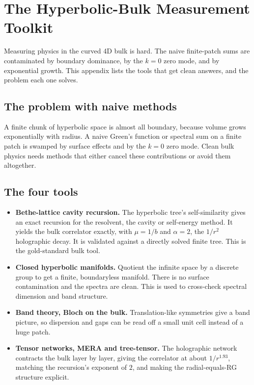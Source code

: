 \section{The Hyperbolic-Bulk Measurement Toolkit}

Measuring physics in the curved 4D bulk is hard. The naive finite-patch sums are contaminated by boundary
dominance, by the $k = 0$ zero mode, and by exponential growth. This appendix lists the tools that get clean
answers, and the problem each one solves.

\subsection{The problem with naive methods}

A finite chunk of hyperbolic space is almost all boundary, because volume grows exponentially with radius. A naive
Green's function or spectral sum on a finite patch is swamped by surface effects and by the $k = 0$ zero mode.
Clean bulk physics needs methods that either cancel these contributions or avoid them altogether.

\subsection{The four tools}

\begin{itemize}
  \item \textbf{Bethe-lattice cavity recursion.} The hyperbolic tree's self-similarity gives an exact recursion
  for the resolvent, the cavity or self-energy method. It yields the bulk correlator exactly, with $\mu = 1/b$ and
  $\alpha = 2$, the $1/r^2$ holographic decay. It is validated against a directly solved finite tree. This is the
  gold-standard bulk tool.
  \item \textbf{Closed hyperbolic manifolds.} Quotient the infinite space by a discrete group to get a finite,
  boundaryless manifold. There is no surface contamination and the spectra are clean. This is used to cross-check
  spectral dimension and band structure.
  \item \textbf{Band theory, Bloch on the bulk.} Translation-like symmetries give a band picture, so dispersion
  and gaps can be read off a small unit cell instead of a huge patch.
  \item \textbf{Tensor networks, MERA and tree-tensor.} The holographic network contracts the bulk layer by
  layer, giving the correlator at about $1/r^{1.93}$, matching the recursion's exponent of $2$, and making the
  radial-equals-RG structure explicit.
\end{itemize}

